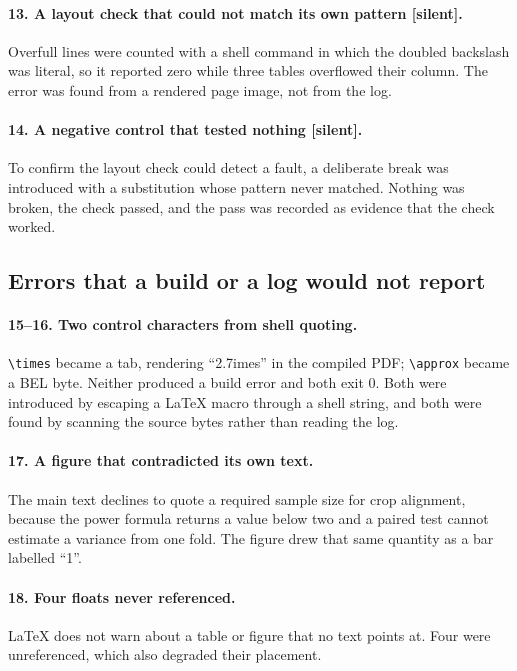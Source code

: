 \documentclass[10pt,twocolumn,letterpaper]{article}
\begin{document}
\paragraph{13. A layout check that could not match its own pattern \textbf{[silent]}.}
Overfull lines were counted with a shell command in which the doubled backslash was
literal, so it reported zero while three tables overflowed their column. The error was
found from a rendered page image, not from the log.

\paragraph{14. A negative control that tested nothing \textbf{[silent]}.} To confirm
the layout check could detect a fault, a deliberate break was introduced with a
substitution whose pattern never matched. Nothing was broken, the check passed, and
the pass was recorded as evidence that the check worked.

\subsection{Errors that a build or a log would not report}

\paragraph{15--16. Two control characters from shell quoting.} \verb|\times| became a
tab, rendering ``2.7imes'' in the compiled PDF; \verb|\approx| became a BEL byte.
Neither produced a build error and both exit 0. Both were introduced by escaping a
LaTeX macro through a shell string, and both were found by scanning the source bytes
rather than reading the log.

\paragraph{17. A figure that contradicted its own text.} The main text declines to
quote a required sample size for crop alignment, because the power formula returns a
value below two and a paired test cannot estimate a variance from one fold. The figure
drew that same quantity as a bar labelled ``1''.

\paragraph{18. Four floats never referenced.} LaTeX does not warn about a table or
figure that no text points at. Four were unreferenced, which also degraded their
placement.
\end{document}
